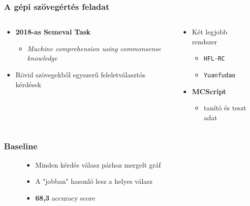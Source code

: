 \documentclass[bigger]{beamer}
\begin{document}
\begin{frame}
	\frametitle{A gépi szövegértés feladat \citep{Chen:2018, Wang:2018}}
	\begin{columns}
		\begin{column}{0.6\textwidth}
			\begin{itemize}
				\pause \item \textbf{2018-as Semeval Task}
				\begin{itemize}
					\item \textit{Machine comprehension using commonsense knowledge}
				\end{itemize}
				\pause \item Rövid szövegekből egyszerű feleletválasztós kérdések
			\end{itemize}
		\end{column}
		\begin{column}{0.5\textwidth}
			\begin{itemize}
				\pause \item Két legjobb rendszer
				\begin{itemize}
					\item \texttt{HFL-RC}
					\item \texttt{Yuanfudao}
				\end{itemize}
				\pause \item \textbf{MCScript}
				\begin{itemize}
					\item tanító és teszt adat
				\end{itemize}
			\end{itemize}
		\end{column}
	\end{columns}
	
\end{frame}


\begin{frame}
    \frametitle{Baseline}
    \begin{figure}
        \centering
        \small
            \begin{itemize}
				\item Minden kérdés válasz párhoz mergelt gráf
				\item A "jobban" hasonló lesz a helyes válasz
				\item \textbf{68,3} accuracy score
			\end{itemize}
        \label{fig:method}
        \end{figure}
\end{frame}
\end{document}
